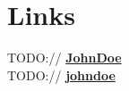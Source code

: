 \documentclass[]{deedy-resume-reversed}
\begin{document}
\begin{minipage}[t]{0.33\textwidth}




\section{Links}
TODO:// \href{https://github.com/}{\bf JohnDoe} \\
TODO://  \href{https://www.linkedin.com/}{\bf johndoe}
\sectionsep

\end{minipage}
\end{document}
